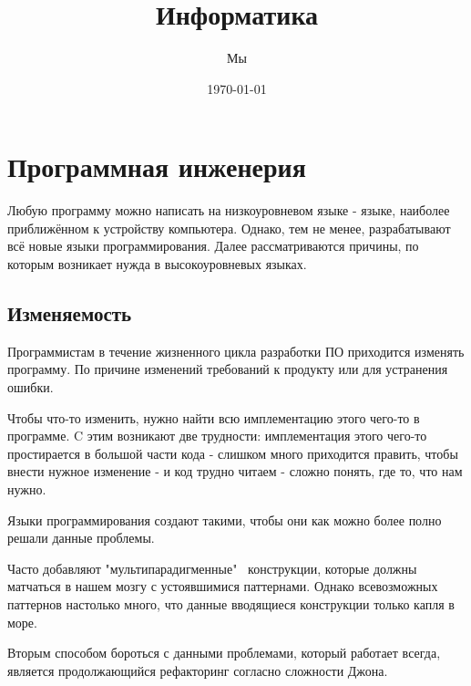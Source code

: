 \documentclass[oneside]{book}
\title{Информатика}
\date{\today}
\author{Мы}
\begin{document}
	\maketitle

	\chapter{Программная инженерия}
	Любую программу можно написать на низкоуровневом
	языке - языке, наиболее приближённом к
	устройству компьютера. Однако, тем не менее,
	разрабатывают всё новые языки программирования.
	Далее рассматриваются причины, по которым
	возникает нужда в высокоуровневых языках.

	\section{Изменяемость}
	Программистам в течение жизненного цикла
	разработки ПО приходится изменять программу.
	По причине изменений требований к продукту
	или для устранения ошибки.

	Чтобы что-то изменить,
	нужно найти всю имплементацию этого чего-то
	в программе. C этим возникают две
	трудности: имплементация этого чего-то
	простирается в большой части кода -
	слишком много приходится править, чтобы
	внести нужное изменение -
	и код трудно читаем - сложно понять,
	где то, что нам нужно.

	Языки программирования создают такими,
	чтобы они как можно более полно
	решали данные проблемы.

	Часто добавляют "мультипарадигменные" \
	конструкции, которые должны матчаться в нашем мозгу
	с устоявшимися паттернами. Однако всевозможных
	паттернов настолько много, что данные вводящиеся
	конструкции только капля в море.

	Вторым способом бороться с данными проблемами,
	который работает всегда, является продолжающийся
	рефакторинг согласно сложности Джона.
\end{document}
